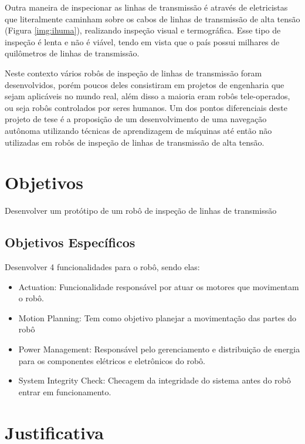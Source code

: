 Outra maneira de inspecionar as linhas de transmissão é através de eletricistas que literalmente caminham sobre os cabos de linhas de transmissão de alta tensão (Figura \ref{img:ihuma}), realizando inspeção visual e termográfica. Esse tipo de inspeção é lenta e não é viável, tendo em vista que o país possui milhares de quilômetros de linhas de transmissão.

Neste contexto vários robôs de inspeção de linhas de transmissão foram desenvolvidos, porém poucos deles consistiram em projetos de engenharia que sejam aplicáveis no mundo real, além disso a maioria eram robôs tele-operados, ou seja robôs controlados por seres humanos. Um dos pontos diferenciais deste projeto de tese é a proposição de um desenvolvimento de uma navegação autônoma utilizando técnicas de aprendizagem de máquinas até então não utilizadas em robôs de inspeção de linhas de transmissão de alta tensão.

\section{Objetivos}
\label{sec:obj}

Desenvolver um protótipo de um robô de inspeção de linhas de transmissão

\subsection{Objetivos Específicos}
\label{ssec:objesp}

Desenvolver 4 funcionalidades para o robô, sendo elas:

\begin{itemize}
	\item Actuation: Funcionalidade responsável por atuar os motores que movimentam o robô.
	\item Motion Planning: Tem como objetivo planejar a movimentação das partes do robô
	\item Power Management: Responsável pelo gerenciamento e distribuição de energia para os componentes elétricos e eletrônicos do robô.
	\item System Integrity Check: Checagem da integridade do sistema antes do robô entrar em funcionamento.
\end{itemize}

\section{Justificativa}
\label{sec:justi}

